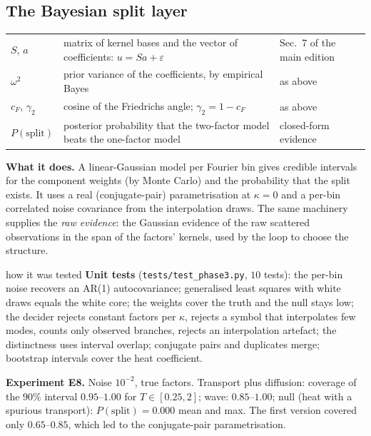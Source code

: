 \subsection{The Bayesian split layer}\label{sec:split}
\begin{symbols}
\begin{tabular}{@{}L{2.6cm}L{6.0cm}L{4.3cm}@{}}
$S$, $a$ & matrix of kernel bases and the vector of coefficients: $u=Sa+\varepsilon$ & Sec.~7 of the main edition\\
$\omega^2$ & prior variance of the coefficients, by empirical Bayes & as above\\
$c_F$, $\gamma_2$ & cosine of the Friedrichs angle; $\gamma_2=1-c_F$ & as above\\
$P(\text{split})$ & posterior probability that the two-factor model beats the one-factor model & closed-form evidence\\
\end{tabular}
\end{symbols}
\textbf{What it does.} A linear-Gaussian model per Fourier bin gives credible intervals for the component weights (by Monte Carlo) and the probability that the split exists. It uses a real (conjugate-pair) parametrisation at $\kappa=0$ and a per-bin correlated noise covariance from the interpolation draws. The same machinery supplies the \emph{raw evidence}: the Gaussian evidence of the raw scattered observations in the span of the factors' kernels, used by the loop to choose the structure.

\begin{explained}{how it was tested}
\textbf{Unit tests} (\texttt{tests/test\_phase3.py}, $10$ tests): the per-bin noise recovers an AR(1) autocovariance; generalised least squares with white draws equals the white core; the weights cover the truth and the null stays low; the decider rejects constant factors per $\kappa$, rejects a symbol that interpolates few modes, counts only observed branches, rejects an interpolation artefact; the distinctness uses interval overlap; conjugate pairs and duplicates merge; bootstrap intervals cover the heat coefficient.

\medskip\textbf{Experiment E8.} Noise $10^{-2}$, true factors. Transport plus diffusion: coverage of the $90\%$ interval $0.95$--$1.00$ for $T\in[0.25,2]$; wave: $0.85$--$1.00$; null (heat with a spurious transport): $P(\text{split})=0.000$ mean and max. The first version covered only $0.65$--$0.85$, which led to the conjugate-pair parametrisation.
\end{explained}

